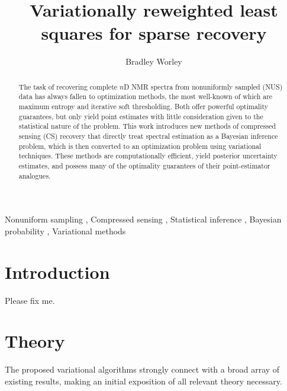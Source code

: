 \documentclass[final,5p,times,twocolumn]{elsarticle}
\begin{document}
\begin{frontmatter}

\title{Variationally reweighted least squares for sparse recovery}

\author{Bradley Worley}


\begin{abstract}
The task of recovering complete $n$D NMR spectra from nonuniformly
sampled (NUS) data has always fallen to optimization methods, the most
well-known of which are maximum entropy and iterative soft thresholding.
Both offer powerful optimality guarantees, but only yield point estimates
with little consideration given to the statistical nature of the problem.
This work introduces new methods of compressed sensing (CS) recovery that
directly treat spectral estimation as a Bayesian inference problem, which
is then converted to an optimization problem using variational techniques.
These methods are computationally efficient, yield posterior uncertainty
estimates, and possess many of the optimality guarantees of their
point-estimator analogues.
\end{abstract}

\begin{keyword}
Nonuniform sampling \sep
Compressed sensing \sep
Statistical inference \sep
Bayesian probability \sep
Variational methods
\end{keyword}

\end{frontmatter}

\section{Introduction}
\label{s:intro}
Please fix me.

\section{Theory}
\label{s:theory}
The proposed variational algorithms strongly connect with a broad array
of existing results, making an initial exposition of all relevant theory
necessary.
\end{document}

